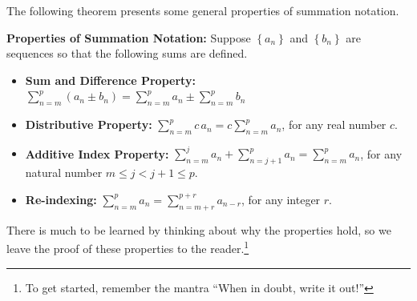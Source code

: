\documentclass{ximera}
\begin{document}
The following theorem presents some general properties of summation notation. 

 


\begin{theorem}  \label{sigmaprops} \textbf{Properties of Summation Notation:} Suppose $\left\{a_{n}\right\}$ and $\left\{b_{n}\right\}$ are sequences so that the following sums are defined. 

\begin{itemize}

\item \textbf{Sum and Difference Property:} $\displaystyle{ \sum_{n=m}^{p} \left(a_{n} \pm b_{n} \right) =  \sum_{n=m}^{p} a_{n} \pm \sum_{n=m}^{p} b_{n} }$

\item \textbf{Distributive Property:} $\displaystyle{\sum_{n=m}^{p} c \, a_{n} = c \sum_{n=m}^{p} a_{n}}$, for any real number $c$.

\item \textbf{Additive Index Property:} $\displaystyle{\sum_{n=m}^{j} a_{n} + \sum_{n=j+1}^{p} a_{n} = \sum_{n=m}^{p}  a_{n}}$, for any natural number $m \leq j < j+1 \leq p$.

\item \textbf{Re-indexing:} $\displaystyle{\sum_{n=m}^{p} a_{n} = \sum_{n=m+r}^{p+r} a_{n-r}}$, for any integer $r$.

\end{itemize}

\end{theorem}


 


There is much to be learned by thinking about why the properties hold, so we leave the proof of these properties to the reader.\footnote{To get started, remember the mantra ``When in doubt, write it out!''}  
\end{document}
